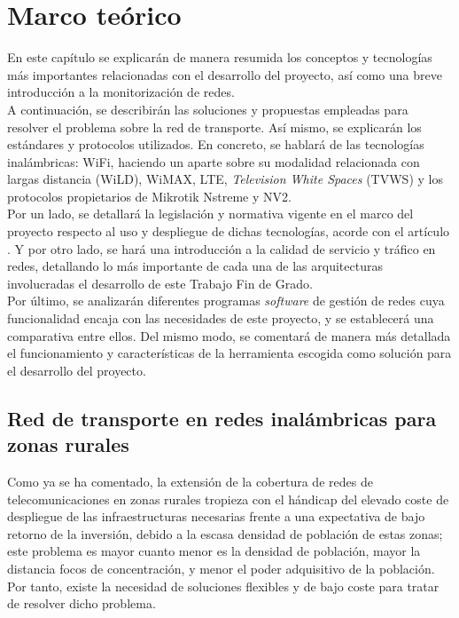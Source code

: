 \chapter{Marco teórico}
\label{cap:marco_teorico}
	En este capítulo se explicarán de manera resumida los conceptos y tecnologías más importantes relacionadas con el desarrollo del proyecto, así como una breve introducción a la monitorización de redes.\\
	
	A continuación, se describirán las soluciones y propuestas empleadas para resolver el problema sobre la red de transporte. Así mismo, se explicarán los estándares y protocolos utilizados. En concreto, se hablará de las tecnologías inalámbricas: WiFi, haciendo un aparte sobre su modalidad relacionada con largas distancia (WiLD), WiMAX, LTE, \textit{Television White Spaces} (TVWS) y los protocolos propietarios de Mikrotik \cite{Mikrotik} Nstreme y NV2.\\
	
	Por un lado, se detallará la legislación y normativa vigente en el marco del proyecto respecto al uso y despliegue de dichas tecnologías, acorde con el artículo \cite{espinoza2018wireless}. Y por otro lado, se hará una introducción a la calidad de servicio y tráfico en redes, detallando lo más importante de cada una de las arquitecturas involucradas el desarrollo de este Trabajo Fin de Grado.\\
	
	Por último, se analizarán diferentes programas \textit{software} de gestión de redes cuya funcionalidad encaja con las necesidades de este proyecto, y se establecerá una comparativa entre ellos. Del mismo modo, se comentará de manera más detallada el funcionamiento y características de la herramienta escogida como solución para el desarrollo del proyecto.
	
\section{Red de transporte en redes inalámbricas para zonas rurales}
	Como ya se ha comentado, la extensión de la cobertura de redes de telecomunicaciones en zonas rurales tropieza con el hándicap del elevado coste de despliegue de las infraestructuras necesarias frente a una expectativa de bajo retorno de la inversión, debido a la escasa densidad de población de estas zonas; este problema es mayor cuanto menor es la densidad de población, mayor la distancia focos de concentración, y menor el poder adquisitivo de la población. Por tanto, existe la necesidad de soluciones flexibles y de bajo coste para tratar de resolver dicho problema.\\
	
